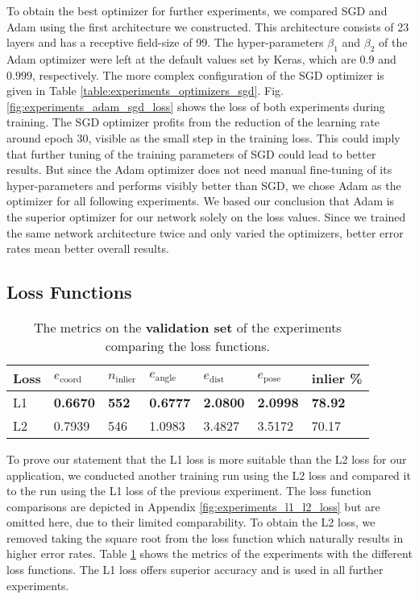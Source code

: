 To obtain the best optimizer for further experiments, we compared SGD and Adam using the first architecture we constructed. This architecture consists of 23 layers and has a receptive field-size of 99. The hyper-parameters $\beta_1$ and $\beta_2$ of the Adam optimizer were left at the default values set by Keras, which are $0.9$ and $0.999$, respectively. The more complex configuration of the SGD optimizer is given in Table \ref{table:experiments_optimizers_sgd}. Fig. \ref{fig:experiments_adam_sgd_loss} shows the loss of both experiments during training. The SGD optimizer profits from the reduction of the learning rate around epoch 30, visible as the small step in the training loss. This could imply that further tuning of the training parameters of SGD could lead to better results. But since the Adam optimizer does not need manual fine-tuning of its hyper-parameters and performs visibly better than SGD, we chose Adam as the optimizer for all following experiments. We based our conclusion that Adam is the superior optimizer for our network solely on the loss values. Since we trained the same network architecture twice and only varied the optimizers, better error rates mean better overall results.

\subsection{Loss Functions}

\begin{table}[]
\centering
\begin{tabular}{|l||llllll|}
\hline 
 Loss  & $e_{\text{coord}}$ & $n_{\text{inlier}}$ & $e_{\text{angle}}$ & $e_{\text{dist}}$  & $e_{\text{pose}}$ & inlier \%  \\ \hline \hline \rowcolor{Gray}
L1 & \textbf{0.6670} & \textbf{552} & \textbf{0.6777} & \textbf{2.0800} & \textbf{2.0998} & \textbf{78.92} \\
L2 & 0.7939                                                            & 546    & 1.0983      & 3.4827 & 3.5172 & 70.17 \\ \hline   
\end{tabular}
\caption{The metrics on the \textbf{validation set} of the experiments comparing the loss functions.}
\label{table:experiments_loss_functions}
\end{table}

To prove our statement that the L1 loss is more suitable than the L2 loss for our application, we conducted another training run using the L2 loss and compared it to the run using the L1 loss of the previous experiment. The loss function comparisons are depicted in Appendix \ref{fig:experiments_l1_l2_loss} but are omitted here, due to their limited comparability. To obtain the L2 loss, we removed taking the square root from the loss function which naturally results in higher error rates. Table \ref{table:experiments_loss_functions} shows the metrics of the experiments with the different loss functions. The L1 loss offers superior accuracy and is used in all further experiments.

